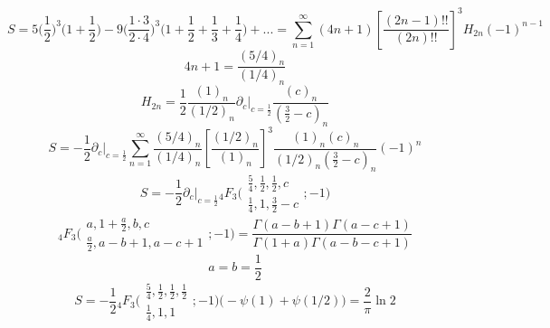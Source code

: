 


	$$S = 5 \Big( \frac{1}{2}\Big)^3 \Big( 1+ \frac{1}{2} \Big)-9 \Big(\frac{1\cdot 3}{2 \cdot 4}\Big)^3 \Big( 1+ \frac{1}{2}+\frac{1}{3}+\frac{1}{4} \Big)+ ... =\sum_{n= 1}^{\infty} (4n+1)\left[ \frac{(2n-1)!!}{(2n)!!} \right]^3 H_{2n} (-1)^{n-1}$$
	$$4n+1 = \frac{(5/4)_n}{(1/4)_n}$$
	$$H_{2n} = \frac{1}{2} \frac{(1)_n}{(1/2)_n}\partial_c \Big|_{c = \frac{1}{2}} \frac{(c)_n}{(\frac{3}{2} - c)_n}$$
	$$S = - \frac{1}{2} \partial_c \Big|_{c = \frac{1}{2}} \sum_{n= 1}^{\infty} \frac{(5/4)_n}{(1/4)_n}\left[ \frac{(1/2)_n}{(1)_n} \right]^3 \frac{(1)_n (c)_n}{(1/2)_n (\frac{3}{2} - c)_n} (-1)^n$$
	$$S = - \frac{1}{2}  \partial_c \Big|_{c = \frac{1}{2}} {}_4F_3 \Big(\begin{array}{c}
		\frac{5}{4}, \frac{1}{2}, \frac{1}{2}, c  \\ \frac{1}{4}, 1, \frac{3}{2}-c
	\end{array}; -1\Big) $$
	$${}_4F_3 \Big(\begin{array}{c}
		a, 1+\frac{a}{2}, b, c  \\ \frac{a}{2}, a-b+1, a-c+1
	\end{array}; -1\Big) = \frac{\Gamma(a-b+1) \Gamma(a-c+1)}{\Gamma(1+a) \Gamma(a-b-c+1) }$$
	$$a = b = \frac{1}{2}$$
	$$S =-\frac{1}{2} {}_4F_3 \Big(\begin{array}{c}
		\frac{5}{4}, \frac{1}{2}, \frac{1}{2}, \frac{1}{2} \\ \frac{1}{4}, 1, 1
	\end{array}; -1\Big) \Big( -\psi(1)+\psi(1/2)\Big) =  \frac{2}{\pi}  \ln2 $$
	
	
	
